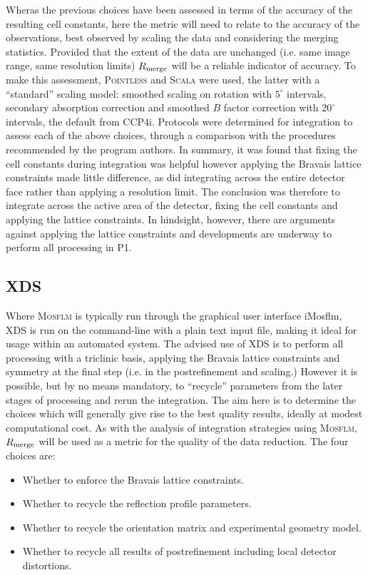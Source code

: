 \documentclass[a4paper, 11pt]{article}
\begin{document}
Wheras the previous choices have been assessed in terms of the accuracy
of the resulting cell constants, here the metric will need to relate
to the accuracy of the observations, best observed by scaling the data
and considering the merging statistics. Provided that the extent of
the data are unchanged (i.e. same image range, same resolution limits)
$R_{\rm{merge}}$ will be a reliable indicator of accuracy. To make
this assessment, \textsc{Pointless} \cite{Evans:ba5084} and \textsc{Scala} were
used, the latter with a ``standard'' scaling model: smoothed
scaling on rotation with $5^{\circ}$ intervals, secondary absorption
correction and smoothed $B$ factor correction with $20^{\circ}$
intervals, the default from CCP4i.
Protocols were determined for integration to assess each
of the above choices, through a 
comparison with the procedures recommended
by the program authors. In summary, it was found that fixing the cell
constants during integration was helpful however applying the Bravais
lattice constraints made little difference, as did integrating across
the entire detector face rather than applying a resolution limit.
The conclusion was therefore to integrate across the
active area of the detector, fixing the cell constants and applying
the lattice constraints. In hindsight, however, there are arguments
against applying the lattice constraints
and developments are underway to perform all processing in P1.

\subsection{XDS}

Where \textsc{Mosflm} is typically run through the graphical user interface
iMosflm, XDS is run on the command-line with a plain text input file,
making it ideal for usage 
within an automated system. The advised use of XDS is to perform all
processing with a triclinic basis, applying the Bravais lattice
constraints and symmetry
at the final step (i.e. in the postrefinement and scaling.) However it
is possible, but by no means mandatory, to ``recycle'' parameters from
the later stages of processing and rerun the integration. The aim here
is to determine the choices which will generally give rise to the best
quality results, ideally at modest computational cost. As with the
analysis of integration strategies using \textsc{Mosflm}, $R_{\rm{merge}}$ will
be used as a metric for the quality of the data reduction. The four
choices are:

\begin{itemize}
\item{Whether to enforce the Bravais lattice constraints.}
\item{Whether to recycle the reflection profile parameters.}
\item{Whether to recycle the orientation matrix and experimental
    geometry model.}
\item{Whether to recycle all results of postrefinement including local
    detector distortions.}
\end{itemize}
\end{document}
